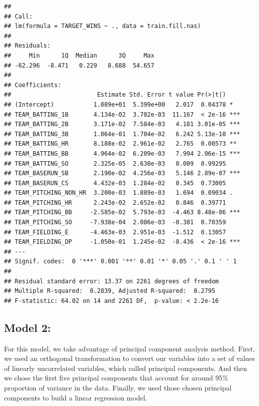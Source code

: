 \documentclass[]{article}
\newenvironment{Shaded}{\begin{snugshade}}{\end{snugshade}}
\newcommand{\KeywordTok}[1]{\textcolor[rgb]{0.13,0.29,0.53}{\textbf{{#1}}}}
\newcommand{\DataTypeTok}[1]{\textcolor[rgb]{0.13,0.29,0.53}{{#1}}}
\newcommand{\StringTok}[1]{\textcolor[rgb]{0.31,0.60,0.02}{{#1}}}
\newcommand{\CommentTok}[1]{\textcolor[rgb]{0.56,0.35,0.01}{\textit{{#1}}}}
\newcommand{\NormalTok}[1]{{#1}}
\begin{document}
\begin{verbatim}
## 
## Call:
## lm(formula = TARGET_WINS ~ ., data = train.fill.nas)
## 
## Residuals:
##     Min      1Q  Median      3Q     Max 
## -62.296  -8.471   0.229   8.688  54.657 
## 
## Coefficients:
##                        Estimate Std. Error t value Pr(>|t|)    
## (Intercept)           1.089e+01  5.399e+00   2.017  0.04378 *  
## TEAM_BATTING_1B       4.134e-02  3.702e-03  11.167  < 2e-16 ***
## TEAM_BATTING_2B       3.171e-02  7.584e-03   4.181 3.01e-05 ***
## TEAM_BATTING_3B       1.064e-01  1.704e-02   6.242 5.13e-10 ***
## TEAM_BATTING_HR       8.188e-02  2.961e-02   2.765  0.00573 ** 
## TEAM_BATTING_BB       4.964e-02  6.209e-03   7.994 2.06e-15 ***
## TEAM_BATTING_SO       2.325e-05  2.630e-03   0.009  0.99295    
## TEAM_BASERUN_SB       2.190e-02  4.256e-03   5.146 2.89e-07 ***
## TEAM_BASERUN_CS       4.432e-03  1.284e-02   0.345  0.73005    
## TEAM_PITCHING_NON_HR  3.200e-03  1.889e-03   1.694  0.09034 .  
## TEAM_PITCHING_HR      2.243e-02  2.652e-02   0.846  0.39771    
## TEAM_PITCHING_BB     -2.585e-02  5.793e-03  -4.463 8.48e-06 ***
## TEAM_PITCHING_SO     -7.938e-04  2.086e-03  -0.381  0.70359    
## TEAM_FIELDING_E      -4.463e-03  2.951e-03  -1.512  0.13057    
## TEAM_FIELDING_DP     -1.050e-01  1.245e-02  -8.436  < 2e-16 ***
## ---
## Signif. codes:  0 '***' 0.001 '**' 0.01 '*' 0.05 '.' 0.1 ' ' 1
## 
## Residual standard error: 13.37 on 2261 degrees of freedom
## Multiple R-squared:  0.2839, Adjusted R-squared:  0.2795 
## F-statistic: 64.02 on 14 and 2261 DF,  p-value: < 2.2e-16
\end{verbatim}

\subsection{Model 2:}\label{model-2}

For this model, we take advantage of principal component analysis
method. First, we used an orthogonal transformation to convert our
variables into a set of values of linearly uncorrelated variables, which
called principal components. And then we chose the first five principal
components that account for around 95\% proportion of variance in the
data. Finally, we used those chosen principal components to build a
linear regression model.

\begin{Shaded}
\end{Shaded}
\end{document}
